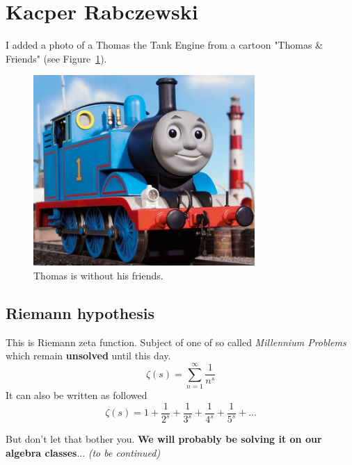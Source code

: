 \hline
\section{Kacper Rabczewski}
\label{}

I added a photo of a Thomas the Tank Engine from a cartoon "Thomas \& Friends" (see Figure~\ref{fig:train}).

\begin{figure}[h]
    \centering
    \includegraphics[width=0.75\textwidth]{pictures/Thomas_Tank_Engine.jpg}
    \caption{Thomas is without his friends.}
    \label{fig:train}
\end{figure}

\subsection*{Riemann hypothesis}
\hspace{5mm} This is Riemann zeta function. Subject of one of so called \textit{Millennium Problems} which remain \textbf{unsolved} until this day.
\begin{displaymath}
    \zeta(s) = \sum_{n=1}^{\infty} \frac{1}{n^s} 
\end{displaymath}
It can also be written as followed
\begin{displaymath}
    \zeta(s) = 1 + \frac{1}{2^s} + \frac{1}{3^s} + \frac{1}{4^s} + \frac{1}{5^s} + ...
\end{displaymath}

But don't let that bother you. \textbf{We will probably be solving it on our algebra classes}... {\footnotesize \textit{(to be continued)}}

